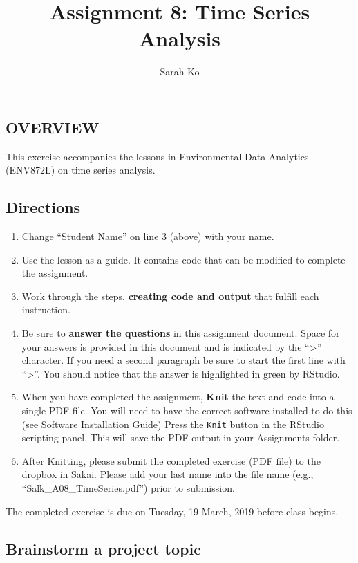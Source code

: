 \documentclass[]{article}
\title{Assignment 8: Time Series Analysis}
\author{Sarah Ko}
\date{}
\providecommand{\tightlist}{%
  \setlength{\itemsep}{0pt}\setlength{\parskip}{0pt}}
\begin{document}
\maketitle

\subsection{OVERVIEW}\label{overview}

This exercise accompanies the lessons in Environmental Data Analytics
(ENV872L) on time series analysis.

\subsection{Directions}\label{directions}

\begin{enumerate}
\def\labelenumi{\arabic{enumi}.}
\tightlist
\item
  Change ``Student Name'' on line 3 (above) with your name.
\item
  Use the lesson as a guide. It contains code that can be modified to
  complete the assignment.
\item
  Work through the steps, \textbf{creating code and output} that fulfill
  each instruction.
\item
  Be sure to \textbf{answer the questions} in this assignment document.
  Space for your answers is provided in this document and is indicated
  by the ``\textgreater{}'' character. If you need a second paragraph be
  sure to start the first line with ``\textgreater{}''. You should
  notice that the answer is highlighted in green by RStudio.
\item
  When you have completed the assignment, \textbf{Knit} the text and
  code into a single PDF file. You will need to have the correct
  software installed to do this (see Software Installation Guide) Press
  the \texttt{Knit} button in the RStudio scripting panel. This will
  save the PDF output in your Assignments folder.
\item
  After Knitting, please submit the completed exercise (PDF file) to the
  dropbox in Sakai. Please add your last name into the file name (e.g.,
  ``Salk\_A08\_TimeSeries.pdf'') prior to submission.
\end{enumerate}

The completed exercise is due on Tuesday, 19 March, 2019 before class
begins.

\subsection{Brainstorm a project
topic}\label{brainstorm-a-project-topic}
\end{document}
